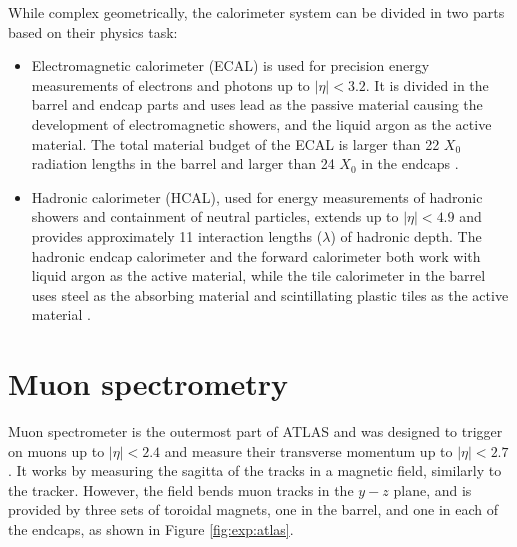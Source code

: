 While complex geometrically, the calorimeter system can be divided
in two parts based on their physics task:
\begin{itemize}
\item Electromagnetic calorimeter (ECAL) is used for precision
energy measurements of electrons and photons up to $|\eta| < 3.2$.
It is divided in the barrel and endcap parts and uses lead as
the passive material causing the development of electromagnetic
showers, and the liquid argon as the active material. The total
material budget of the ECAL is larger than 22 $X_0$ radiation
lengths in the barrel and larger than 24 $X_0$ in the endcaps 
\cite{CERN-LHCC-96-041, Aad:2008zzm}.
\item Hadronic calorimeter (HCAL), used for energy measurements
of hadronic showers and containment of neutral particles, extends
up to $|\eta| < 4.9$ and provides approximately 11 interaction
lengths ($\lambda$) of hadronic depth. The hadronic endcap
calorimeter and the forward calorimeter both work with liquid
argon as the active material, while the tile calorimeter in the
barrel uses steel as the absorbing material and scintillating
plastic tiles as the active material \cite{CERN-LHCC-96-041,
artamonov2008atlas, Aad:2008zzm}.
\end{itemize}

\section{Muon spectrometry}

Muon spectrometer is the outermost part of ATLAS and was designed to
trigger on muons up to $|\eta| < 2.4$ and measure their transverse momentum up
to $|\eta| < 2.7$. It works by measuring the sagitta of the tracks
in a magnetic field, similarly to the tracker. However, the field
bends muon tracks in the $y-z$ plane, and is provided by three sets of
toroidal magnets, one in the barrel, and one in each of the endcaps,
as shown in Figure \ref{fig:exp:atlas}. 

